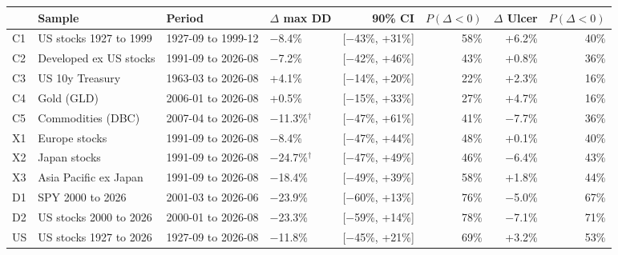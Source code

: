 \begin{tabular}{llllrrrr}
\toprule
 & Sample & Period & $\Delta$ max DD & 90\% CI & $P(\Delta<0)$ & $\Delta$ Ulcer & $P(\Delta<0)$ \\
\midrule
C1 & US stocks 1927 to 1999 & 1927-09 to 1999-12 & $-$8.4\% & [$-$43\%, +31\%] & 58\% & +6.2\% & 40\% \\
C2 & Developed ex US stocks & 1991-09 to 2026-08 & $-$7.2\% & [$-$42\%, +46\%] & 43\% & +0.8\% & 36\% \\
\midrule
C3 & US 10y Treasury & 1963-03 to 2026-08 & +4.1\% & [$-$14\%, +20\%] & 22\% & +2.3\% & 16\% \\
C4 & Gold (GLD) & 2006-01 to 2026-08 & +0.5\% & [$-$15\%, +33\%] & 27\% & +4.7\% & 16\% \\
C5 & Commodities (DBC) & 2007-04 to 2026-08 & $-$11.3\%$^\dagger$ & [$-$47\%, +61\%] & 41\% & $-$7.7\% & 36\% \\
\midrule
X1 & Europe stocks & 1991-09 to 2026-08 & $-$8.4\% & [$-$47\%, +44\%] & 48\% & +0.1\% & 40\% \\
X2 & Japan stocks & 1991-09 to 2026-08 & $-$24.7\%$^\dagger$ & [$-$47\%, +49\%] & 46\% & $-$6.4\% & 43\% \\
X3 & Asia Pacific ex Japan & 1991-09 to 2026-08 & $-$18.4\% & [$-$49\%, +39\%] & 58\% & +1.8\% & 44\% \\
\midrule
D1 & SPY 2000 to 2026 & 2001-03 to 2026-06 & $-$23.9\% & [$-$60\%, +13\%] & 76\% & $-$5.0\% & 67\% \\
D2 & US stocks 2000 to 2026 & 2000-01 to 2026-08 & $-$23.3\% & [$-$59\%, +14\%] & 78\% & $-$7.1\% & 71\% \\
US & US stocks 1927 to 2026 & 1927-09 to 2026-08 & $-$11.8\% & [$-$45\%, +21\%] & 69\% & +3.2\% & 53\% \\
\bottomrule
\end{tabular}
